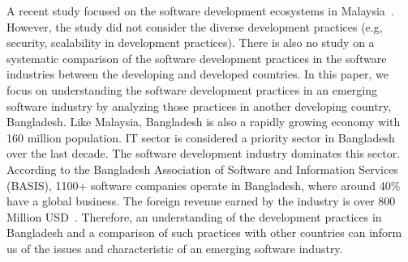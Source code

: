 A recent study 
focused on the software development ecosystems in Malaysia~\cite{Baharom2006}. However, the study 
did not consider the diverse development practices (e.g, security, scalability in development practices). There 
is also no study on a systematic comparison of the software development practices in the software industries 
between the developing and developed countries. In this paper, we focus on understanding the software development 
practices in an emerging software industry 
by analyzing those practices in another developing country, Bangladesh. Like Malaysia, 
Bangladesh is also a rapidly growing economy with 160 million
population. IT sector is considered a priority sector in Bangladesh over the
last decade. The software development industry dominates this sector. According to the
Bangladesh Association of Software and Information Services (BASIS), 1100+
software companies operate in Bangladesh, where around 40\% have a global
business. The foreign revenue earned by the industry is over 800 Million
USD~\cite{BASIS2018}. Therefore, an understanding of the development practices in Bangladesh and a comparison of such practices 
with other countries can inform us of the issues and characteristic of an emerging software industry.
 
 
